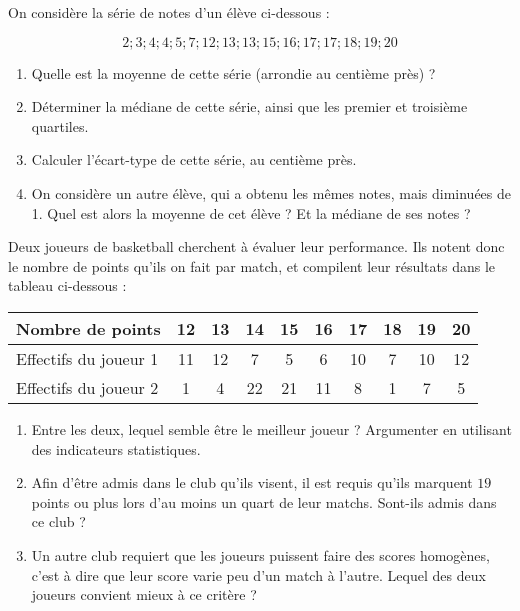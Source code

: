 \documentclass[
	classe=$2^{de}$,
	headerTitle=Évaluation\space Chapitre\space 4
]{évaluation}
\begin{document}
\begin{exercice}[6]

	On considère la série de notes d'un élève ci-dessous :

	$$ 2; 3; 4; 4; 5; 7; 12; 13; 13; 15; 16; 17; 17; 18; 19; 20 $$

	\begin{enumerate}
		\item Quelle est la moyenne de cette série (arrondie au centième près) ? 
		\item Déterminer la médiane de cette série, ainsi que les premier et troisième quartiles.   
		\item Calculer l'écart-type de cette série, au centième près. 
		\item On considère un autre élève, qui a obtenu les mêmes notes, mais diminuées de 1. Quel est alors la moyenne de cet élève ? Et la médiane de ses notes ?
	\end{enumerate}
\end{exercice}

\begin{exercice}[5]
	Deux joueurs de basketball cherchent à évaluer leur performance. Ils notent donc le nombre de points qu'ils on fait par match, et compilent leur résultats dans le tableau ci-dessous :

	\begin{center}
		\begin{tabular}{|l|c|c|c|c|c|c|c|c|c|}
			\hline
			Nombre de points      & 12 & 13 & 14 & 15 & 16 & 17 & 18 & 19 & 20 \tabularnewline \hline
			Effectifs du joueur 1 & 11 & 12 & 7  & 5  & 6  & 10 & 7  & 10 & 12 \tabularnewline \hline
			Effectifs du joueur 2 & 1  & 4  & 22 & 21 & 11 & 8  & 1  & 7  & 5 \tabularnewline \hline
		\end{tabular}
	\end{center}

	\begin{enumerate}
		\item Entre les deux, lequel semble être le meilleur joueur ? Argumenter en utilisant des indicateurs statistiques.
		\item Afin d'être admis dans le club qu'ils visent, il est requis qu'ils marquent $19$ points ou plus lors d'au moins un quart de leur matchs. Sont-ils admis dans ce club ?
		\item Un autre club requiert que les joueurs puissent faire des scores homogènes, c'est à dire que leur score varie peu d'un match à l'autre. Lequel des deux joueurs convient mieux à ce critère ?
	\end{enumerate}
\end{exercice}
\end{document}
